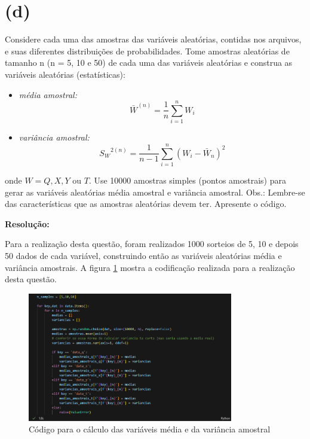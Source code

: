\documentclass[]{abntex2}
\begin{document}
\section*{\textbf{(d)}}

\noindent Considere cada uma das amostras das variáveis aleatórias, contidas nos arquivos, e suas diferentes distribuições de probabilidades. Tome amostras aleatórias de tamanho n (n = 5, 10 e 50) de cada uma das variáveis aleatórias e construa as variáveis aleatórias (estatísticas):

\begin{itemize}
    \item \textit{média amostral:} \[{\bar{W}}^{(n)}=\dfrac{1}{n} \sum_{i=1}^{n} W_i\]
    \item \textit{variância amostral:} \[{S_W}^{2(n)}=\dfrac{1}{n-1} \sum_{i=1}^{n}(W_i - \bar{W}_n)^2\]
\end{itemize}

onde $W = Q, X, Y$ ou $T$. Use 10000 amostras simples (pontos amostrais) para gerar
as variáveis aleatórias média amostral e variância amostral. Obs.: Lembre-se das
características que as amostras aleatórias devem ter. Apresente o código.

\textbf{Resolução:}

Para a realização desta questão, foram realizados 1000 sorteios de 5, 10 e depois 50 dados de cada variável, construindo então as variáveis aleatórias média e variância amostrais. A figura \ref{fig:cod} mostra a codificação realizada para a realização desta questão.

\begin{figure}
    \centering 
    \includegraphics[width=0.8\textwidth]{imgs/cod.png}
    \caption{Código para o cálculo das variáveis média e da variância amostral}
    \label{fig:cod} %
\end{figure}
\end{document}
